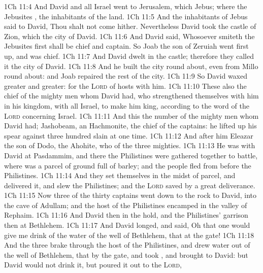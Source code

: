 \vs 1Ch 11:4 And David and all Israel went to Jerusalem, which  Jebus; where the Jebusites , the inhabitants of the land.
\vs 1Ch 11:5 And the inhabitants of Jebus said to David, Thou shalt not come hither. Nevertheless David took the castle of Zion, which  the city of David.
\vs 1Ch 11:6 And David said, Whosoever smiteth the Jebusites first shall be chief and captain. So Joab the son of Zeruiah went first up, and was chief.
\vs 1Ch 11:7 And David dwelt in the castle; therefore they called it the city of David.
\vs 1Ch 11:8 And he built the city round about, even from Millo round about: and Joab repaired the rest of the city.
\vs 1Ch 11:9 So David waxed greater and greater: for the \textsc{Lord} of hosts  with him.
\vs 1Ch 11:10 These also  the chief of the mighty men whom David had, who strengthened themselves with him in his kingdom,  with all Israel, to make him king, according to the word of the \textsc{Lord} concerning Israel.
\vs 1Ch 11:11 And this  the number of the mighty men whom David had; Jashobeam, an Hachmonite, the chief of the captains: he lifted up his spear against three hundred slain  at one time.
\vs 1Ch 11:12 And after him  Eleazar the son of Dodo, the Ahohite, who  of the three mighties.
\vs 1Ch 11:13 He was with David at Pasdammim, and there the Philistines were gathered together to battle, where was a parcel of ground full of barley; and the people fled from before the Philistines.
\vs 1Ch 11:14 And they set themselves in the midst of  parcel, and delivered it, and slew the Philistines; and the \textsc{Lord} saved  by a great deliverance.
\vs 1Ch 11:15 Now three of the thirty captains went down to the rock to David, into the cave of Adullam; and the host of the Philistines encamped in the valley of Rephaim.
\vs 1Ch 11:16 And David  then in the hold, and the Philistines' garrison  then at Bethlehem.
\vs 1Ch 11:17 And David longed, and said, Oh that one would give me drink of the water of the well of Bethlehem, that  at the gate!
\vs 1Ch 11:18 And the three brake through the host of the Philistines, and drew water out of the well of Bethlehem, that  by the gate, and took , and brought  to David: but David would not drink  it, but poured it out to the \textsc{Lord},
